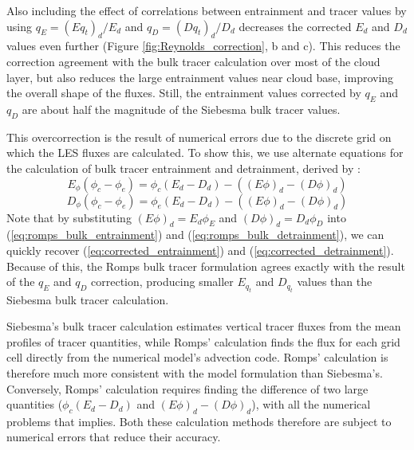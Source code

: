 \documentclass[12pt]{article}
\begin{document}
Also including the effect of correlations between entrainment and tracer values 
by using $q_E = (E q_t)_d/E_d$ and $q_D = (D q_t)_d/D_d$ decreases the corrected 
$E_d$ and $D_d$ values even further (Figure \ref{fig:Reynolds_correction}, b and 
c).  This reduces the correction agreement with the bulk tracer calculation over 
most of the cloud layer, but also reduces the large entrainment values near cloud 
base, improving the overall shape of the fluxes.  Still, the entrainment values 
corrected by $q_E$ and $q_D$ are about half the magnitude of the Siebesma bulk 
tracer values.

This overcorrection is the result of numerical errors due to the discrete 
grid on which the LES fluxes are calculated.  To show this, we use alternate 
equations for the calculation of bulk tracer entrainment and detrainment, 
derived by \cite{Romps2010}:
\begin{equation}
  \label{eq:romps_bulk_entrainment}
    E_{\phi}(\phi_c - \phi_e) = \phi_c(E_d-D_d) - ((E\phi)_d - (D\phi)_d)
\end{equation}
\begin{equation}
  \label{eq:romps_bulk_detrainment}
    D_{\phi}(\phi_c - \phi_e) = \phi_e(E_d-D_d) - ((E\phi)_d - (D\phi)_d)
\end{equation}
Note that by substituting $(E\phi)_d = E_d \phi_E$ and $(D\phi)_d = D_d \phi_D$ 
into (\ref{eq:romps_bulk_entrainment}) and (\ref{eq:romps_bulk_detrainment}),
we can quickly recover (\ref{eq:corrected_entrainment}) and 
(\ref{eq:corrected_detrainment}).  Because of this, the Romps bulk tracer 
formulation agrees exactly with the result of the $q_E$ and $q_D$ correction,
producing smaller $E_{q_t}$ and $D_{q_t}$ values than the Siebesma bulk tracer 
calculation.  

Siebesma's bulk tracer calculation estimates vertical tracer fluxes from the 
mean profiles of tracer quantities, while Romps' calculation finds the flux for 
each grid cell directly from the numerical model's advection code.  Romps' 
calculation is therefore much more consistent with the model formulation than 
Siebesma's.  Conversely, Romps' calculation requires finding the difference of 
two large quantities ($\phi_c(E_d-D_d)$ and $(E\phi)_d - (D\phi)_d$), with all 
the numerical problems that implies.  Both these calculation methods therefore 
are subject to numerical errors that reduce their accuracy.  

\end{document}
